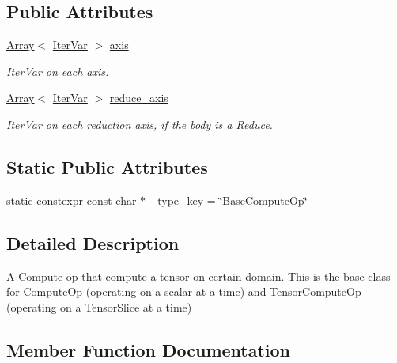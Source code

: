 \subsection*{Public Attributes}
\begin{DoxyCompactItemize}
\item 
\hyperlink{classtvm_1_1Array}{Array}$<$ \hyperlink{classtvm_1_1tir_1_1IterVar}{Iter\+Var} $>$ \hyperlink{classtvm_1_1te_1_1BaseComputeOpNode_a21617a643897727c51ded2b7260df4c3}{axis}
\begin{DoxyCompactList}\small\item\em Iter\+Var on each axis. \end{DoxyCompactList}\item 
\hyperlink{classtvm_1_1Array}{Array}$<$ \hyperlink{classtvm_1_1tir_1_1IterVar}{Iter\+Var} $>$ \hyperlink{classtvm_1_1te_1_1BaseComputeOpNode_ad0df643468fc148d80afd7116abdd2ac}{reduce\+\_\+axis}
\begin{DoxyCompactList}\small\item\em Iter\+Var on each reduction axis, if the body is a Reduce. \end{DoxyCompactList}\end{DoxyCompactItemize}
\subsection*{Static Public Attributes}
\begin{DoxyCompactItemize}
\item 
static constexpr const char $\ast$ \hyperlink{classtvm_1_1te_1_1BaseComputeOpNode_aba03c3b6818ea897ce4f0e544532534a}{\+\_\+type\+\_\+key} = \char`\"{}Base\+Compute\+Op\char`\"{}
\end{DoxyCompactItemize}


\subsection{Detailed Description}
A Compute op that compute a tensor on certain domain. This is the base class for Compute\+Op (operating on a scalar at a time) and Tensor\+Compute\+Op (operating on a Tensor\+Slice at a time) 

\subsection{Member Function Documentation}
